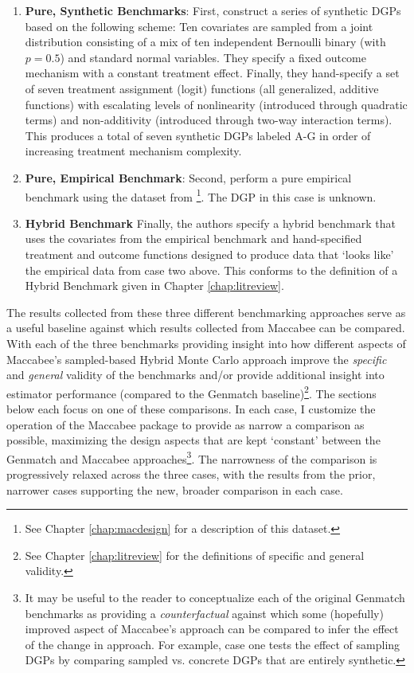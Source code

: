 \documentclass[../main.tex]{subfiles}
\begin{document}
\begin{enumerate}
    \item \textbf{Pure, Synthetic Benchmarks}: First, \citeauthor{Diamond2013GeneticStudies} construct a series of synthetic DGPs based on the following scheme: Ten covariates are sampled from a joint distribution consisting of a mix of ten independent Bernoulli binary (with $p=0.5$) and standard normal variables. They specify a fixed outcome mechanism with a constant treatment effect. Finally, they hand-specify a set of seven treatment assignment (logit) functions (all generalized, additive functions) with escalating levels of nonlinearity (introduced through quadratic terms) and non-additivity (introduced through two-way interaction terms). This produces a total of seven synthetic DGPs labeled A-G in order of increasing treatment mechanism complexity.
    
    
    \item \textbf{Pure, Empirical Benchmark}: Second, \citeauthor{Diamond2013GeneticStudies} perform a pure empirical benchmark using the dataset from \textcite{Lalonde1986EvaluatingData}\footnote{See Chapter \ref{chap:macdesign} for a description of this dataset.}. The DGP in this case is unknown.
    
    
    \item \textbf{Hybrid Benchmark} Finally, the authors specify a hybrid benchmark that uses the covariates from the \textcite{Lalonde1986EvaluatingData} empirical benchmark and hand-specified treatment and outcome functions designed to produce data that `looks like' the empirical data from case two above. This conforms to the definition of a Hybrid Benchmark given in Chapter \ref{chap:litreview}.
\end{enumerate}

The results collected from these three different benchmarking approaches serve as a useful baseline against which results collected from Maccabee can be compared. With each of the three benchmarks providing insight into how different aspects of Maccabee's sampled-based Hybrid Monte Carlo approach improve the \textit{specific} and \textit{general} validity of the benchmarks and/or provide additional insight into estimator performance (compared to the Genmatch baseline)\footnote{See Chapter \ref{chap:litreview} for the definitions of specific and general validity.}. The sections below each focus on one of these comparisons. In each case, I customize the operation of the Maccabee package to provide as narrow a comparison as possible, maximizing the design aspects that are kept `constant' between the Genmatch and Maccabee approaches\footnote{It may be useful to the reader to conceptualize each of the original Genmatch benchmarks as providing a \textit{counterfactual} against which some (hopefully) improved aspect of Maccabee's approach can be compared to infer the effect of the change in approach. For example, case one tests the effect of sampling DGPs by comparing sampled vs. concrete DGPs that are entirely synthetic.}. The narrowness of the comparison is progressively relaxed across the three cases, with the results from the prior, narrower cases supporting the new, broader comparison in each case.
\end{document}
